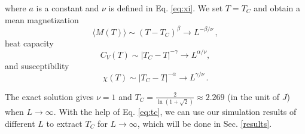 where $a$ is a constant and $\nu$ is defined in Eq. \ref{eq:xi}. 
We set $T=T_C$ and obtain a mean magnetization
\begin{equation}
\langle M(T) \rangle \sim \left(T-T_C\right)^{\beta}
\rightarrow L^{-\beta/\nu}\,,
\label{eq:scale1}
\end{equation}
heat capacity
\begin{equation}
C_V(T) \sim \left|T_C-T\right|^{-\gamma} \rightarrow L^{\alpha/\nu},
\label{eq:scale2}
\end{equation}
and susceptibility
\begin{equation}
\chi(T) \sim \left|T_C-T\right|^{-\alpha} \rightarrow L^{\gamma/\nu}\,.
\label{eq:scale3}
\end{equation}
\par
The exact solution gives $\nu=1$ and $T_C=\frac{2}{\ln\left(1+\sqrt{2}\right)}\approx 2.269$ 
(in the unit of $J$) when $L\rightarrow\infty$. 
With the help of Eq. \ref{eq:tc}, we can use our simulation results of different $L$ to extract $T_C$ for $L\rightarrow\infty$, 
which will be done in Sec. \ref{results}. 
